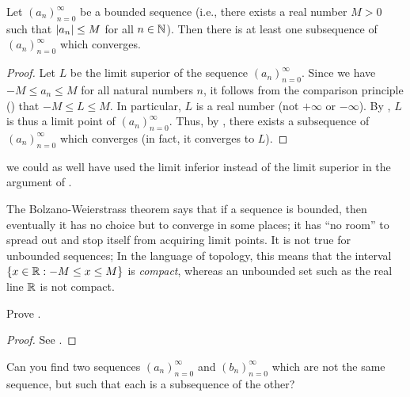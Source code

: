 \begin{thm}\label{i:6.6.8}
  Let \((a_n)_{n = 0}^\infty\) be a bounded sequence
  (i.e., there exists a real number \(M > 0\) such that \(\left\lvert a_n\right\rvert \leq M\) for all \(n \in \mathbb{N}\)).
  Then there is at least one subsequence of \((a_n)_{n = 0}^\infty\) which converges.
\end{thm}

\begin{proof}
  Let \(L\) be the limit superior of the sequence \((a_n)_{n = 0}^\infty\).
  Since we have \(-M \leq a_n \leq M\) for all natural numbers \(n\), it follows from the comparison principle () that \(-M \leq L \leq M\).
  In particular, \(L\) is a real number (not \(+\infty\) or \(-\infty\)).
  By , \(L\) is thus a limit point of \((a_n)_{n = 0}^\infty\).
  Thus, by , there exists a subsequence of \((a_n)_{n = 0}^\infty\) which converges
  (in fact, it converges to \(L\)).
\end{proof}

\begin{note}
  we could as well have used the limit inferior instead of the limit superior in the argument of .
\end{note}

\begin{rmk}\label{i:6.6.9}
  The Bolzano-Weierstrass theorem says that if a sequence is bounded, then eventually it has no choice but to converge in some places;
  it has ``no room'' to spread out and stop itself from acquiring limit points.
  It is not true for unbounded sequences;
  In the language of topology, this means that the interval \(\left\lbrace x \in \mathbb{R} : -M \leq x \leq M\right\rbrace\) is \emph{compact}, whereas an unbounded set such as the real line \(\mathbb{R}\) is not compact.
\end{rmk}

\exercisesection

\begin{ex}\label{i:ex:6.6.1}
  Prove .
\end{ex}

\begin{proof}
  See .
\end{proof}

\begin{ex}\label{i:ex:6.6.2}
  Can you find two sequences \((a_n)_{n = 0}^\infty\) and \((b_n)_{n = 0}^\infty\) which are not the same sequence, but such that each is a subsequence of the other?
\end{ex}

